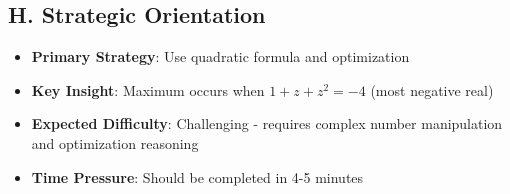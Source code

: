 \documentclass[11pt]{article}
\begin{document}
\begin{problembox}
\subsection*{H. Strategic Orientation}
\begin{itemize}[leftmargin=*]
    \item \textbf{Primary Strategy}: Use quadratic formula and optimization
    \item \textbf{Key Insight}: Maximum occurs when $1+z+z^2 = -4$ (most negative real)
    \item \textbf{Expected Difficulty}: Challenging - requires complex number manipulation and optimization reasoning
    \item \textbf{Time Pressure}: Should be completed in 4-5 minutes
\end{itemize}
\end{problembox}
\end{document}
